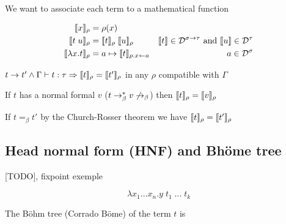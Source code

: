     We want to associate each term to a mathematical function

    \begin{align*}
      \llbracket x \rrbracket_\rho &= \rho(x) \\
      \llbracket t\;u \rrbracket_\rho &= \llbracket t \rrbracket_\rho\;\llbracket u \rrbracket_\rho
      & \llbracket t \rrbracket \in \mathcal D^{\sigma \to \tau} \text{ and }
        \llbracket u \rrbracket \in \mathcal D^\tau \\
      \llbracket \lambda x. t\rrbracket_\rho &= a \mapsto \llbracket t \rrbracket_{\rho. x\leftarrow a}
      & a \in \mathcal D^\sigma
    \end{align*}

    \lemma $t \to t' \wedge \Gamma \vdash t : \tau \Rightarrow \llbracket t
    \rrbracket_\rho = \llbracket t' \rrbracket_\rho$ in any $\rho$ compatible with $\Gamma$

    \corr If $t$ has a normal formal $v$ ($t \to_\beta^* v \not \to_\beta$)
      then $\llbracket t \rrbracket_\rho = \llbracket v \rrbracket_\rho$

    \corr If $t =_\beta t'$ by the Church-Rosser theorem we have $\llbracket t
    \rrbracket_\rho = \llbracket t' \rrbracket_\rho$

  \subsection{Head normal form (HNF) and Bhöme tree}

  [TODO], fixpoint exemple

  $$\lambda x_1 \ldots x_n. y\; t_1\;\ldots\;t_k$$

  \begin{center}
  \end{center}

  The Böhm tree (Corrado Böme) of the term $t$ is

